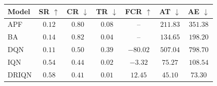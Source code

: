 \begin{table}
\centering
\small
\begin{tabular*}{\columnwidth}{@{\extracolsep{\fill}}lcccccc@{}}
\toprule
Model & SR $\uparrow$ & CR $\downarrow$ & TR $\downarrow$ & FCR $\uparrow$ & AT $\downarrow$ & AE $\downarrow$ \\
\midrule
APF   & $0.12$ & $0.80$ & $0.08$ & --      & $211.83$ & $351.38$ \\
BA    & $0.14$ & $0.82$ & $0.04$ & --      & $134.65$ & $198.20$ \\
DQN   & $0.11$ & $0.50$ & $0.39$ & $-80.02$& $507.04$ & $798.70$ \\
IQN   & $0.54$ & $0.44$ & $0.02$ & $-3.32$ & $75.27$  & $108.54$ \\
DRIQN & $\mathbf{0.58}$ & $\mathbf{0.41}$ & $\mathbf{0.01}$ & $\mathbf{12.45}$ & $\mathbf{45.10}$ & $\mathbf{73.30}$ \\
\bottomrule
\end{tabular*}


\end{table}